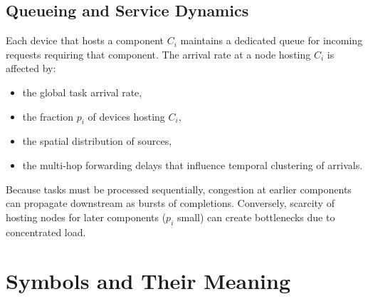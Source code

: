 \documentclass[12pt,a4paper]{article}
\begin{document}
\subsection{Queueing and Service Dynamics}
Each device that hosts a component $C_i$ maintains a dedicated queue for incoming requests requiring that component. The arrival rate at a node hosting $C_i$ is affected by:
\begin{itemize}
    \item the global task arrival rate,
    \item the fraction $p_i$ of devices hosting $C_i$,
    \item the spatial distribution of sources,
    \item the multi-hop forwarding delays that influence temporal clustering of arrivals.
\end{itemize}

Because tasks must be processed sequentially, congestion at earlier components can propagate downstream as bursts of completions. Conversely, scarcity of hosting nodes for later components ($p_i$ small) can create bottlenecks due to concentrated load.

\section{Symbols and Their Meaning}
\end{document}
